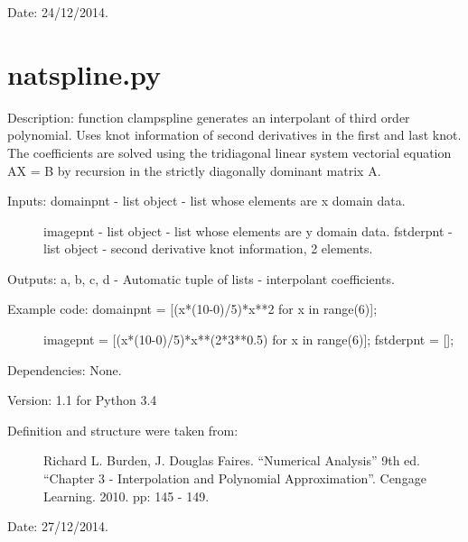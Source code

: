 \documentclass[letterpaper,10pt,oneside]{sphinxmanual}
\theoremstyle{plain}%
\theoremstyle{definition}%
\theoremstyle{remark}%
\begin{document}
Date: 24/12/2014.


\section{natspline.py}
\label{code:module-natspline}\label{code:natspline-py}
Description: function clampspline generates an interpolant of third order 
polynomial. Uses knot information of second derivatives in the first and last
knot. The coefficients are solved using the tridiagonal linear system 
vectorial equation AX = B by recursion in the strictly diagonally dominant 
matrix A.
\begin{description}
\item[{Inputs: domainpnt - list object - list whose elements are x domain data.}] \leavevmode
imagepnt - list object - list whose elements are y domain data.
fstderpnt - list object - second derivative knot information, 2 elements.

\end{description}

Outputs: a, b, c, d - Automatic tuple of lists - interpolant coefficients.
\begin{description}
\item[{Example code: domainpnt = {[}(x*(10-0)/5)*x**2 for x in range(6){]};}] \leavevmode
imagepnt = {[}(x*(10-0)/5)*x**(2*3**0.5) for x in range(6){]};
fstderpnt = {[}{]};

\end{description}

Dependencies: None.

Version: 1.1 for Python 3.4
\begin{description}
\item[{Definition and structure were taken from:}] \leavevmode
Richard L. Burden, J. Douglas Faires. ``Numerical Analysis'' 9th ed.
``Chapter 3 - Interpolation and Polynomial Approximation''. 
Cengage Learning. 2010. pp: 145 - 149.

\end{description}




Date: 27/12/2014.
\end{document}
